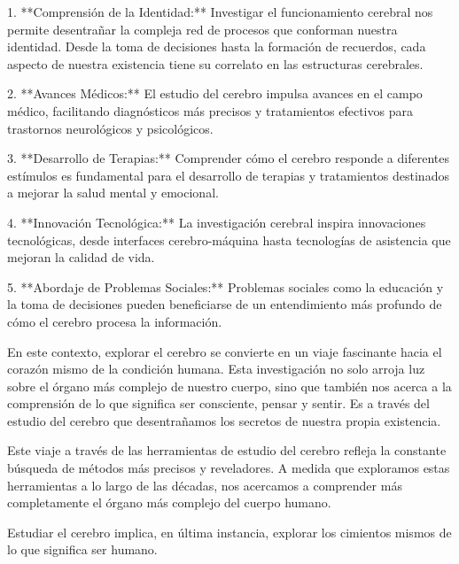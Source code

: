 \documentclass[12pt,oneside]{uhthesis}
\begin{document}
1. **Comprensión de la Identidad:** Investigar el funcionamiento cerebral nos permite desentrañar la compleja red de procesos que conforman nuestra identidad. Desde la toma de decisiones hasta la formación de recuerdos, cada aspecto de nuestra existencia tiene su correlato en las estructuras cerebrales.

2. **Avances Médicos:** El estudio del cerebro impulsa avances en el campo médico, facilitando diagnósticos más precisos y tratamientos efectivos para trastornos neurológicos y psicológicos.

3. **Desarrollo de Terapias:** Comprender cómo el cerebro responde a diferentes estímulos es fundamental para el desarrollo de terapias y tratamientos destinados a mejorar la salud mental y emocional.

4. **Innovación Tecnológica:** La investigación cerebral inspira innovaciones tecnológicas, desde interfaces cerebro-máquina hasta tecnologías de asistencia que mejoran la calidad de vida.

5. **Abordaje de Problemas Sociales:** Problemas sociales como la educación y la toma de decisiones pueden beneficiarse de un entendimiento más profundo de cómo el cerebro procesa la información.

En este contexto, explorar el cerebro se convierte en un viaje fascinante hacia el corazón mismo de la condición humana. Esta investigación no solo arroja luz sobre el órgano más complejo de nuestro cuerpo, sino que también nos acerca a la comprensión de lo que significa ser consciente, pensar y sentir. Es a través del estudio del cerebro que desentrañamos los secretos de nuestra propia existencia.





Este viaje a través de las herramientas de estudio del cerebro refleja la constante búsqueda de métodos más precisos y reveladores. A medida que exploramos estas herramientas a lo largo de las décadas, nos acercamos a comprender más completamente el órgano más complejo del cuerpo humano.

 Estudiar el cerebro implica, en última instancia, explorar los cimientos mismos de lo que significa ser humano.
\end{document}
